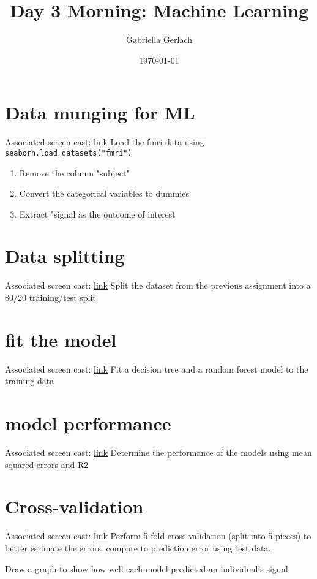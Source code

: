 \documentclass{article}
\title{Day 3 Morning: Machine Learning}
\author{Gabriella Gerlach}
\date{\today}
\begin{document}
\maketitle
\section{Data munging for ML}
Associated screen cast: \href{https://www.youtube.com/watch?v=3S19iHHfqzA}{link}
Load the fmri data using \texttt{seaborn.load\_datasets("fmri")}
\begin{enumerate}
		\item Remove the column "subject"
		\item Convert the categorical variables to dummies 
		\item Extract "signal as the outcome of interest
\end{enumerate}

\section{Data splitting}
Associated screen cast: \href{https://www.youtube.com/watch?v=mNVH8V5FLeA}{link}
Split the dataset from the previous assignment into a 80/20 training/test split 
\section{fit the model}
Associated screen cast: \href{https://www.youtube.com/watch?v=LL_AQPg3Gfk}{link}
Fit a decision tree and a random forest model to the training data
\section{model performance}
Associated screen cast: \href{https://www.youtube.com/watch?v=VfSIL-Bzz8k}{link}
Determine the performance of the models using mean squared errors and R2
\section{Cross-validation}
Associated screen cast: \href{https://www.youtube.com/watch?v=kUuZzYHbK5I}{link}
Perform 5-fold cross-validation (split into 5 pieces) to better estimate the errors. 
compare to prediction error using test data.

Draw a graph to show how well each model predicted an individual's signal 
\end{document}
